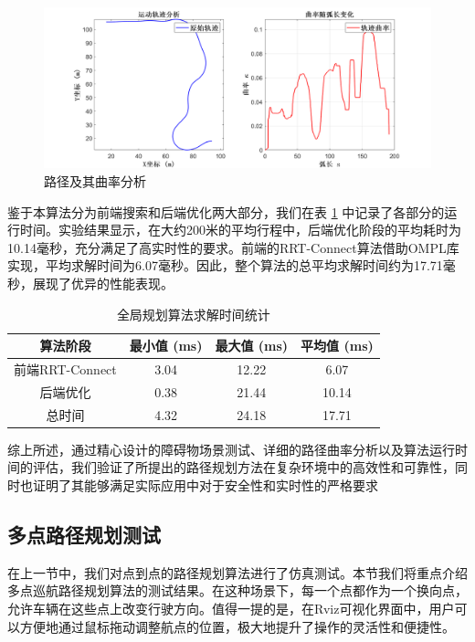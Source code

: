\documentclass[master,academic]{ysuthesis} %
\begin{document}
		\begin{figure}[!ht]
		\centering
		\includegraphics[width=1\textwidth]{datasingle.png}
		\caption{路径及其曲率分析}
		\label{fig:datasingle}
		\end{figure}

		鉴于本算法分为前端搜索和后端优化两大部分，我们在表 \ref{tab:global_planning_time} 中记录了各部分的运行时间。实验结果显示，在大约200米的平均行程中，后端优化阶段的平均耗时为10.14毫秒，充分满足了高实时性的要求。前端的RRT-Connect算法借助OMPL库实现，平均求解时间为6.07毫秒。因此，整个算法的总平均求解时间约为17.71毫秒，展现了优异的性能表现。
		\begin{table}[!ht]
			\caption{全局规划算法求解时间统计}
			\label{tab:global_planning_time}
			\centering
			\begin{tabular}{cccc}
				\toprule
				算法阶段   & 最小值 (ms) & 最大值 (ms) & 平均值 (ms) \\
				\midrule
				前端RRT-Connect & 3.04    & 12.22   & 6.07       \\
				后端优化       & 0.38    & 21.44    & 10.14      \\
				总时间         & 4.32    & 24.18    & 17.71      \\
				\bottomrule
			\end{tabular}
		\end{table}

		综上所述，通过精心设计的障碍物场景测试、详细的路径曲率分析以及算法运行时间的评估，我们验证了所提出的路径规划方法在复杂环境中的高效性和可靠性，同时也证明了其能够满足实际应用中对于安全性和实时性的严格要求

		\subsection{多点路径规划测试}
		在上一节中，我们对点到点的路径规划算法进行了仿真测试。本节我们将重点介绍多点巡航路径规划算法的测试结果。在这种场景下，每一个点都作为一个换向点，允许车辆在这些点上改变行驶方向。值得一提的是，在Rviz可视化界面中，用户可以方便地通过鼠标拖动调整航点的位置，极大地提升了操作的灵活性和便捷性。
\end{document}
